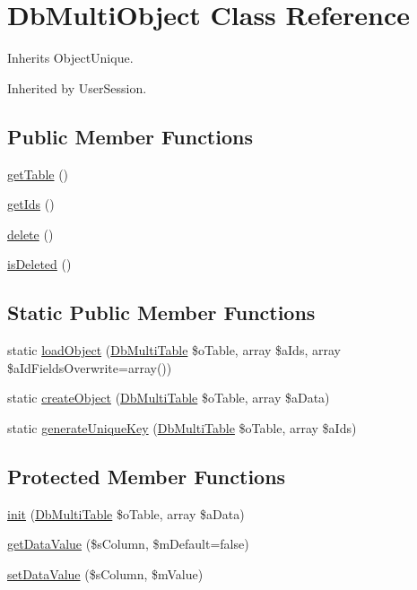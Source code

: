\hypertarget{class_db_multi_object}{\section{Db\-Multi\-Object Class Reference}
\label{class_db_multi_object}
}


Inherits Object\-Unique.



Inherited by User\-Session.

\subsection*{Public Member Functions}
\begin{DoxyCompactItemize}
\item 
\hyperlink{class_db_multi_object_a3180cf2d5df3802306fb32c80e6b2ae2}{get\-Table} ()
\item 
\hyperlink{class_db_multi_object_af78a13cce363d883b40b7016f37495d6}{get\-Ids} ()
\item 
\hyperlink{class_db_multi_object_ac549813c2d1ed2590b3336b5a78e1e02}{delete} ()
\item 
\hyperlink{class_db_multi_object_a9876147e88c9ef1f3ef5cc478943df58}{is\-Deleted} ()
\end{DoxyCompactItemize}
\subsection*{Static Public Member Functions}
\begin{DoxyCompactItemize}
\item 
static \hyperlink{class_db_multi_object_a4aa2addd75a0c020eab128e993511561}{load\-Object} (\hyperlink{class_db_multi_table}{Db\-Multi\-Table} \$o\-Table, array \$a\-Ids, array \$a\-Id\-Fields\-Overwrite=array())
\item 
static \hyperlink{class_db_multi_object_a88e81f6230f993e77565ba8971975876}{create\-Object} (\hyperlink{class_db_multi_table}{Db\-Multi\-Table} \$o\-Table, array \$a\-Data)
\item 
static \hyperlink{class_db_multi_object_ac67e13579c064e19285f2805b4e407c6}{generate\-Unique\-Key} (\hyperlink{class_db_multi_table}{Db\-Multi\-Table} \$o\-Table, array \$a\-Ids)
\end{DoxyCompactItemize}
\subsection*{Protected Member Functions}
\begin{DoxyCompactItemize}
\item 
\hyperlink{class_db_multi_object_a5da1d9a8884be5c791b9f59db4617da9}{init} (\hyperlink{class_db_multi_table}{Db\-Multi\-Table} \$o\-Table, array \$a\-Data)
\item 
\hyperlink{class_db_multi_object_ae5dfb8b5593e242d5bead57b86c55b99}{get\-Data\-Value} (\$s\-Column, \$m\-Default=false)
\item 
\hyperlink{class_db_multi_object_a3d1024edc48e66f484095d9a9ad77ff5}{set\-Data\-Value} (\$s\-Column, \$m\-Value)
\end{DoxyCompactItemize}


